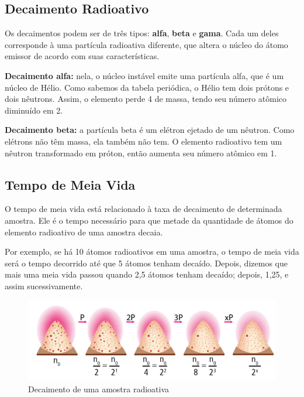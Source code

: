 \documentclass[11pt]{article}
\begin{document}
\begin{multicols}{2}
\section{Decaimento Radioativo}
\label{sec:orga862efc}

Os decaimentos podem ser de três tipos: \textbf{alfa}, \textbf{beta} e \textbf{gama}. Cada um deles corresponde à uma partícula radioativa diferente, que altera o núcleo do átomo emissor de acordo com suas características.

\textbf{Decaimento alfa:} nela, o núcleo instável emite uma partícula alfa, que é um núcleo de Hélio. Como sabemos da tabela periódica, o Hélio tem dois prótons e dois nêutrons. Assim, o elemento perde 4 de massa, tendo seu número atômico diminuído em 2.

\begin{center}
\end{center}

\textbf{Decaimento beta:} a partícula beta é um elétron ejetado de um nêutron. Como elétrons não têm massa, ela também não tem. O elemento radioativo tem um nêutron transformado em próton, então aumenta seu número atômico em 1.


\begin{center}
\end{center}

\subsection{Tempo de Meia Vida}
\label{sec:org8b24cfa}

O tempo de meia vida está relacionado à taxa de decaimento de determinada amostra. Ele é o tempo necessário para que metade da quantidade de átomos do elemento radioativo de uma amostra decaia.

Por exemplo, se há 10 átomos radioativos em uma amostra, o tempo de meia vida será o tempo decorrido até que 5 átomos tenham decaído. Depois, dizemos que mais uma meia vida passou quando 2,5 átomos tenham decaído; depois, 1,25, e assim sucessivamente.

\begin{figure}[H]
\centering
\includegraphics[scale=0.3]{./../QM/tempo-vida.png}
\caption{Decaimento de uma amostra radioativa}
\end{figure}



\end{multicols}
\end{document}
